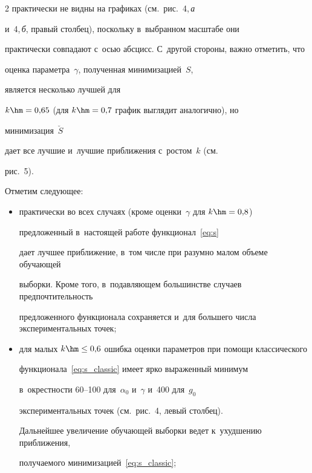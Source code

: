 \begin{multicols}{2}
практически не видны на графиках (см.\ рис.~4,\,\textit{а} 

и~4,\,\textit{б}, правый столбец), поскольку в~выбранном масштабе они

практически совпадают с~осью абсцисс. С~другой стороны, важно отметить, что 

оценка параметра~$\gamma$, полученная минимизацией~$S$, 

является несколько лучшей для

$k \hm= 0{,}65$ (для $k \hm= 0{,}7$ график выглядит аналогично), но 

минимизация~$\breve{S}$

дает все лучшие и~лучшие приближения с~ростом~$k$ (см.\ 

рис.~5).



Отметим следующее:

\begin{itemize}

  \item практически во всех случаях (кроме оценки~$\gamma$ для $k \hm= 0{,}8$)

    предложенный в~настоящей работе функционал~\eqref{eq:s}

    дает лучшее приближение, в~том числе при разумно малом объеме обуча\-ющей 

выборки. Кроме того, в~подав\-ля\-ющем большинстве случаев предпочтительность 

предложенного  функционала  сохраняется и~для большего числа экспериментальных точек;\\[-8pt]

  \item для малых $k \hm\leq 0{,}6$ ошибка оценки параметров при помощи классического

    функционала~\eqref{eq:s_classic} имеет ярко выраженный минимум 

    в~окрест\-ности 60--100 для~$\alpha_0$ и~$\gamma$ и~400 для~$g_0$ 

    экспериментальных точек  (см.\ рис.~4, левый столбец).

    Дальнейшее увеличение обучающей выборки ведет к~ухудшению приближения, 

получаемого минимизацией~\eqref{eq:s_classic};

 \end{itemize}

 





\end{multicols}
